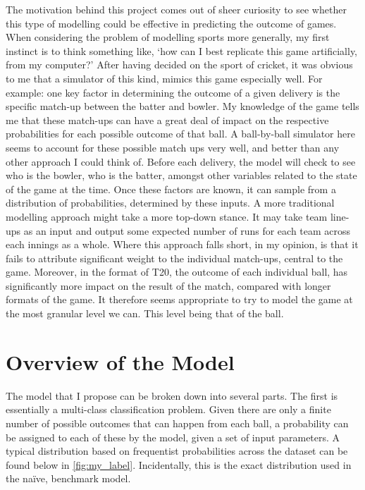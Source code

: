 The motivation behind this project comes out of sheer curiosity to see whether this type of modelling could be effective in predicting the outcome of games. When considering the problem of modelling sports more generally, my first instinct is to think something like, ‘how can I best replicate this game artificially, from my computer?’ After having decided on the sport of cricket, it was obvious to me that a simulator of this kind, mimics this game especially well. For example: one key factor in determining the outcome of a given delivery is the specific match-up between the batter and bowler. My knowledge of the game tells me that these match-ups can have a great deal of impact on the respective probabilities for each possible outcome of that ball. A ball-by-ball simulator here seems to account for these possible match ups very well, and better than any other approach I could think of. Before each delivery, the model will check to see who is the bowler, who is the batter, amongst other variables related to the state of the game at the time. Once these factors are known, it can sample from a distribution of probabilities, determined by these inputs. A more traditional modelling approach might take a more top-down stance. It may take team line-ups as an input and output some expected number of runs for each team across each innings as a whole. Where this approach falls short, in my opinion, is that it fails to attribute significant weight to the individual match-ups, central to the game. Moreover, in the format of T20, the outcome of each individual ball, has significantly more impact on the result of the match, compared with longer formats of the game. It therefore seems appropriate to try to model the game at the most granular level we can. This level being that of the ball. 

\section{Overview of the Model}

The model that I propose can be broken down into several parts. The first is essentially a multi-class classification problem. Given there are only a finite number of possible outcomes that can happen from each ball, a probability can be assigned to each of these by the model, given a set of input parameters. A typical distribution based on frequentist probabilities across the dataset can be found below in \autoref{fig:my_label}. Incidentally, this is the exact distribution used in the naïve, benchmark model.

